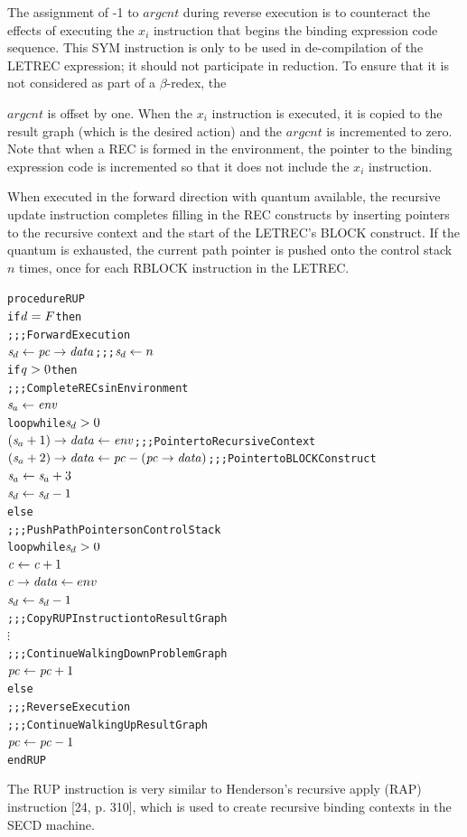 The assignment of -1 to \(argcnt\) during reverse execution is to counteract the effects
of executing the \(x_i\)\THOR{)} instruction that begins the binding expression
code sequence. This SYM instruction is only to be used in de-compilation of the LETREC
expression; it should not participate in reduction. To ensure that it is not considered as
part of a \(\beta\)-redex, the


\(argcnt\) is offset by one. When the \(x_i\)\THOR{)} instruction is executed, it
is copied to the result graph (which is the desired action) and the \(argcnt\) is
incremented to zero. Note that when a REC is formed in the environment, the pointer to the
binding expression code is incremented so that it does not include the \(x_i\)\THOR{)}
instruction.

When executed in the forward direction with quantum available, the recursive update
instruction completes filling in the REC constructs by inserting pointers to the recursive
context and the start of the LETREC's BLOCK construct. If the quantum is exhausted, the
current path pointer is pushed onto the control stack \(n\) times, once for each RBLOCK
instruction in the LETREC.

\begin{alltt}
procedure RUP
  if \(\rt{d} = F\) then
    ;;; Forward Execution
    \(\rtsd \leftarrow \rtfield{pc}{data}\)        ;;; \(\rtsd \leftarrow n\)
    if \(\rt{q} > 0\) then
      ;;; Complete RECs in Environment
      \(\rtsa \leftarrow \rt{env}\)
      loop while \(\rtsd > 0\)
        \((\rtsa+1)\rightarrow\mathit{data} \leftarrow \rt{env}\)       ;;; Pointer to Recursive Context
        \((\rtsa+2)\rightarrow\mathit{data} \leftarrow \rt{pc}-(\rtfield{pc}{data})\)  ;;; Pointer to BLOCK Construct
        \(\rtsa \leftarrow \rtsa+3\)
        \(\rtsd \leftarrow \rtsd-1\)
    else
      ;;; Push Path Pointers on Control Stack
      loop while \(\rtsd > 0\)
        \(\rt{c} \leftarrow \rt{c}+1\)
        \(\rtfield{c}{data} \leftarrow env\)
        \(\rtsd \leftarrow \rtsd-1\)
      ;;; Copy RUP Instruction to Result Graph
      \(\vdots\)
    ;;; Continue Walking Down Problem Graph
    \(\rt{pc} \leftarrow \rt{pc}+1\)
  else
    ;;; Reverse Execution
    ;;; Continue Walking Up Result Graph
    \(\rt{pc} \leftarrow \rt{pc}-1\)
end RUP
\end{alltt}

The RUP instruction is very similar to Henderson's recursive apply (RAP) instruction
[24, p. 310], which is used to create recursive binding contexts in the SECD machine.

